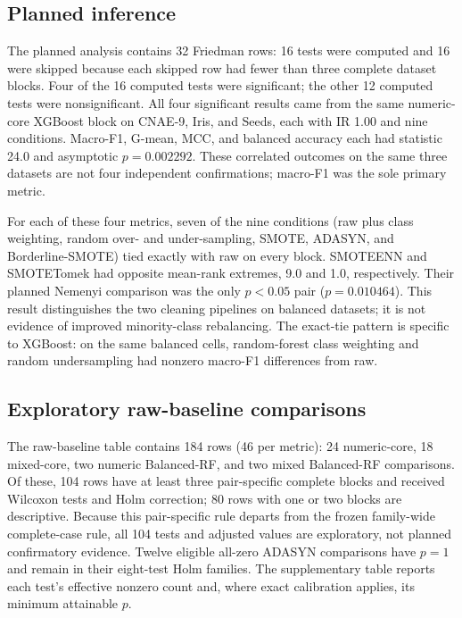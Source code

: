 \documentclass[10pt]{article}
\begin{document}
\subsection{Planned inference}

The planned analysis contains 32 Friedman rows: 16 tests were computed and 16 were skipped because each skipped row had fewer than three complete dataset blocks. Four of the 16 computed tests were significant; the other 12 computed tests were nonsignificant. All four significant results came from the same numeric-core XGBoost block on CNAE-9, Iris, and Seeds, each with IR 1.00 and nine conditions. Macro-F1, G-mean, MCC, and balanced accuracy each had statistic 24.0 and asymptotic $p=0.002292$. These correlated outcomes on the same three datasets are not four independent confirmations; macro-F1 was the sole primary metric.

For each of these four metrics, seven of the nine conditions (raw plus class weighting, random over- and under-sampling, SMOTE, ADASYN, and Borderline-SMOTE) tied exactly with raw on every block. SMOTEENN and SMOTETomek had opposite mean-rank extremes, 9.0 and 1.0, respectively. Their planned Nemenyi comparison was the only $p<0.05$ pair ($p=0.010464$). This result distinguishes the two cleaning pipelines on balanced datasets; it is not evidence of improved minority-class rebalancing. The exact-tie pattern is specific to XGBoost: on the same balanced cells, random-forest class weighting and random undersampling had nonzero macro-F1 differences from raw.

\subsection{Exploratory raw-baseline comparisons}

The raw-baseline table contains 184 rows (46 per metric): 24 numeric-core, 18 mixed-core, two numeric Balanced-RF, and two mixed Balanced-RF comparisons. Of these, 104 rows have at least three pair-specific complete blocks and received Wilcoxon tests and Holm correction; 80 rows with one or two blocks are descriptive. Because this pair-specific rule departs from the frozen family-wide complete-case rule, all 104 tests and adjusted values are exploratory, not planned confirmatory evidence. Twelve eligible all-zero ADASYN comparisons have $p=1$ and remain in their eight-test Holm families. The supplementary table reports each test's effective nonzero count and, where exact calibration applies, its minimum attainable $p$.
\end{document}
